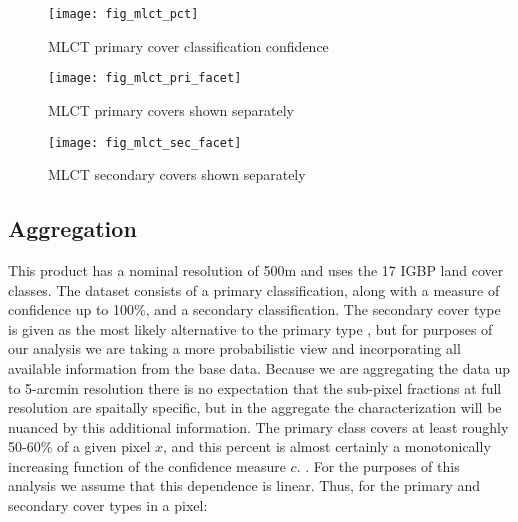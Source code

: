 \begin{figure} 
\begin{center}
  

\texttt{[image: fig\_mlct\_pct]}
\end{center} 
\caption{MLCT primary cover classification confidence} 
\label{fig:mlct_pct} 
\end{figure} 


\begin{figure} 
\begin{center}
  

\texttt{[image: fig\_mlct\_pri\_facet]}
\end{center} 
\caption{MLCT primary covers shown separately} 
\label{fig:mlct_pri_reclass} 
\end{figure} 


\begin{figure} 
\begin{center}
  

\texttt{[image: fig\_mlct\_sec\_facet]}
\end{center} 
\caption{MLCT secondary covers shown separately} 
\label{fig:mlct_pri_reclass} 
\end{figure} 


\subsection{Aggregation}
\label{sec:mlct-aggr}

This product has a nominal resolution of 500m and uses the 17 IGBP
land cover classes. The dataset consists of a primary classification,
along with a measure of confidence up to 100\%, and a secondary
classification.  The secondary cover type is given as the most likely
alternative to the primary type \citep{Friedl2010}, but for purposes
of our analysis we are taking a more probabilistic view and
incorporating all available information from the base data.  Because
we are aggregating the data up to 5-arcmin resolution there is no
expectation that the sub-pixel fractions at full resolution are
spaitally specific, but in the aggregate the characterization will be
nuanced by this additional information.  The primary class covers at
least roughly 50-60\% of a given pixel $x$, and this percent is almost
certainly a monotonically increasing function of the confidence
measure $c$.  .  For the purposes of this
analysis we assume that this dependence is linear. Thus, for the
primary and secondary cover types in a pixel:

